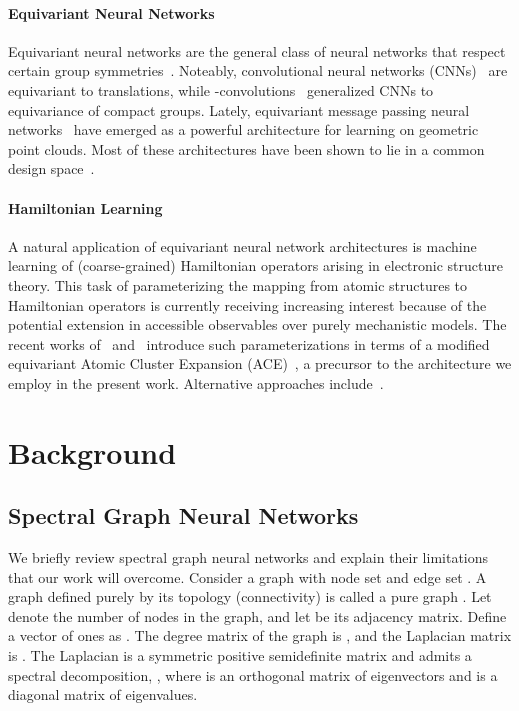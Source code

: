 \documentclass{article} \usepackage{iclr2024_conference,times}
\begin{document}
\paragraph{Equivariant Neural Networks} Equivariant neural networks are the general class of neural networks that respect certain group symmetries~\citep{Bronstein:2021mdi}. Noteably, convolutional neural networks (CNNs)~\citep{CNNlecun} are equivariant to translations, while -convolutions~\citep{CohenSteerable2016, s.2018spherical, pmlr-v80-kondor18a} generalized CNNs to equivariance of compact groups. Lately, equivariant message passing neural networks~\citep{Anderson2019CormorantCM, Welling2021EGNN, brandstetter2022geometric, nequip, Batatia2022mace, Batatia2022de} have emerged as a powerful architecture for learning on geometric point clouds. Most of these architectures have been shown to lie in a common design space~\cite{Batatia2022de, batatia2023general}.

\paragraph{Hamiltonian Learning} A natural application of equivariant neural network architectures is machine learning of (coarse-grained) Hamiltonian operators arising in electronic structure theory. This task of parameterizing the mapping from atomic structures to Hamiltonian operators is currently receiving increasing interest because of the potential extension in accessible observables over purely mechanistic models. The recent works of~\cite{Nigam2022-hamiltonians} and~\cite{2021-acetb1} introduce such parameterizations in terms of a modified equivariant Atomic Cluster Expansion (ACE)~\citep{Drautz2020-tensors}, a precursor to the architecture we employ in the present work. Alternative approaches include~\citep{Hegde2017-ay, Schutt2019-um, Unke-sg-2021, Gu2023-om}.



\section{Background}

\subsection{Spectral Graph Neural Networks}

We briefly review spectral graph neural networks and explain their limitations that our work will overcome.
Consider a graph  with node set  and edge set . A graph defined purely by its topology (connectivity) is called a pure graph {\bf}.
Let  denote the number of nodes in the graph, and let  be its adjacency matrix. Define a vector of ones as . The degree matrix of the graph is , and the Laplacian matrix is .
The Laplacian is a symmetric positive semidefinite matrix and admits a spectral decomposition, , where  is an orthogonal matrix of eigenvectors and  is a diagonal matrix of eigenvalues.
\end{document}
